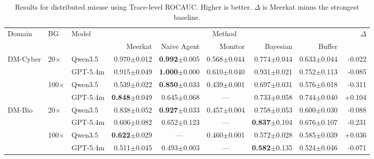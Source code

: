 \documentclass{article} %
\newcommand{\res}[2]{#1{\scriptsize$\pm$#2}}
\newcommand{\bestres}[2]{\textbf{#1}{\scriptsize$\pm$#2}}
\newcommand{\na}{\multicolumn{1}{c}{---}}
\newcommand{\ourmethod}{Meerkat\xspace}
\begin{document}
\begin{table}[t]
  \centering
  \tiny
  \begin{tabular}{@{}lllrrrrrr@{}}
    \toprule
    \multirow{2}{*}{Domain} & \multirow{2}{*}{BG} & \multirow{2}{*}{Model}
      & \multicolumn{5}{c}{Method} & \multirow{2}{*}{$\Delta$} \\
    \cmidrule(lr){4-8}
      & & & Meerkat & Naive Agent & Monitor & Bayesian & Buffer & \\
    \midrule
    \multirow{4}{*}{DM-Cyber} & \multirow{2}{*}{20$\times$} & Qwen3.5 & \res{0.970}{0.012} & \bestres{0.992}{0.005} & \res{0.568}{0.044} & \res{0.774}{0.044} & \res{0.633}{0.044} & -0.022 \\
     & & GPT-5.4m & \res{0.915}{0.049} & \bestres{1.000}{0.000} & \res{0.610}{0.040} & \res{0.931}{0.021} & \res{0.752}{0.113} & -0.085 \\
    \cmidrule(lr){2-9}
     & \multirow{2}{*}{100$\times$} & Qwen3.5 & \res{0.539}{0.022} & \bestres{0.850}{0.033} & \res{0.439}{0.001} & \res{0.697}{0.031} & \res{0.576}{0.018} & -0.311 \\
     & & GPT-5.4m & \bestres{0.848}{0.049} & \res{0.645}{0.068} & \na & \res{0.733}{0.058} & \res{0.744}{0.040} & +0.104 \\
    \midrule
    \multirow{4}{*}{DM-Bio} & \multirow{2}{*}{20$\times$} & Qwen3.5 & \res{0.838}{0.052} & \bestres{0.927}{0.033} & \res{0.457}{0.004} & \res{0.758}{0.053} & \res{0.600}{0.030} & -0.088 \\
     & & GPT-5.4m & \res{0.606}{0.082} & \res{0.652}{0.123} & \na & \bestres{0.837}{0.104} & \res{0.676}{0.107} & -0.231 \\
    \cmidrule(lr){2-9}
     & \multirow{2}{*}{100$\times$} & Qwen3.5 & \bestres{0.622}{0.029} & \na & \res{0.460}{0.001} & \res{0.572}{0.028} & \res{0.585}{0.039} & +0.036 \\
     & & GPT-5.4m & \res{0.511}{0.045} & \res{0.493}{0.003} & \na & \bestres{0.582}{0.135} & \res{0.524}{0.046} & -0.071 \\
    \bottomrule
  \end{tabular}
  \caption{Results for distributed misuse using Trace-level ROCAUC. Higher is better. $\Delta$ is \ourmethod minus the strongest baseline.}
  \label{tab:dm-trace-rocauc}
\end{table}
\end{document}
